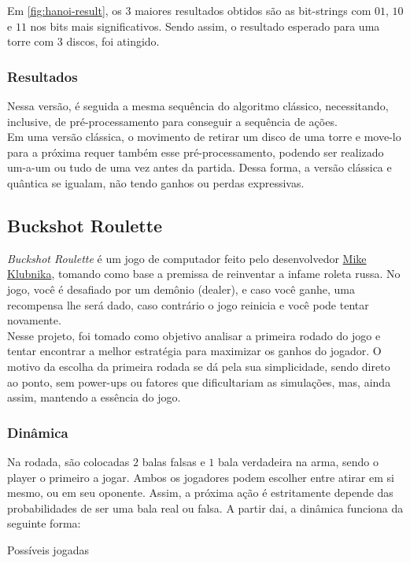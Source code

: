 \documentclass{article}
\begin{document}
Em \ref{fig:hanoi-result}, os $3$ maiores resultados obtidos são as bit-strings com $01$, $10$ e $11$ nos bits mais significativos. Sendo assim, o resultado esperado para uma torre com 3 discos, foi atingido.

\subsubsection{Resultados}
Nessa versão, é seguida a mesma sequência do algoritmo clássico, necessitando, inclusive, de pré-processamento para conseguir a sequência de ações.\\
Em uma versão clássica, o movimento de retirar um disco de uma torre e move-lo para a próxima requer também esse pré-processamento, podendo ser realizado um-a-um ou tudo de uma vez antes da partida. Dessa forma, a versão clássica e quântica se igualam, não tendo ganhos ou perdas expressivas.

\subsection{Buckshot Roulette} \label{buckshot}
\emph{Buckshot Roulette} é um jogo de computador feito pelo desenvolvedor \href{https://mikeklubnika.itch.io/}{Mike Klubnika}, tomando como base a premissa de reinventar a infame roleta russa. No jogo, você é desafiado por um demônio (dealer), e caso você ganhe, uma recompensa lhe será dado, caso contrário o jogo reinicia e você pode tentar novamente.\\
Nesse projeto, foi tomado como objetivo analisar a primeira rodado do jogo e tentar encontrar a melhor estratégia para maximizar os ganhos do jogador. O motivo da escolha da primeira rodada se dá pela sua simplicidade, sendo direto ao ponto, sem power-ups ou fatores que dificultariam as simulações, mas, ainda assim, mantendo a essência do jogo.

\subsubsection{Dinâmica}
Na rodada, são colocadas $2$ balas falsas e $1$ bala verdadeira na arma, sendo o player o primeiro a jogar. Ambos os jogadores podem escolher entre atirar em si mesmo, ou em seu oponente. Assim, a próxima ação é estritamente depende das probabilidades de ser uma bala real ou falsa. A partir dai, a dinâmica funciona da seguinte forma: 

\begin{algorithm}[H]
	\begin{algorithmic}
			\Else
			\EndIf
		\Else
			\Else
			\EndIf
		\EndIf

	\end{algorithmic}
	\caption{Possíveis jogadas}
	\label{alg:buckshot-roulette}
\end{algorithm}
\end{document}
